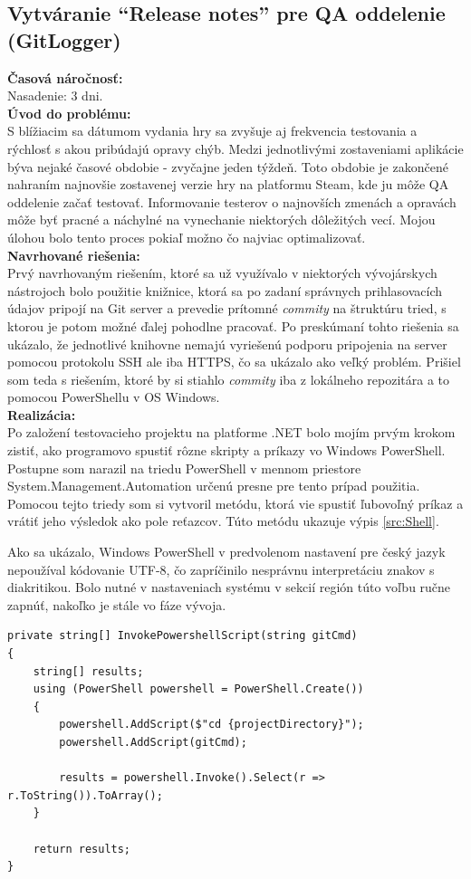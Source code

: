 \documentclass[slovak,bachelorpractice]{diploma}
\begin{document}
\subsection{Vytváranie \enquote{Release notes} pre QA oddelenie (GitLogger)}
\label{sec:GitLogger}
\textbf{Časová náročnosť:} \\ Nasadenie: 3 dni.\\
\textbf{Úvod do problému:} \\ S blížiacim sa dátumom vydania hry sa zvyšuje aj frekvencia testovania a rýchlosť s akou pribúdajú opravy chýb. Medzi jednotlivými zostaveniami aplikácie býva nejaké časové obdobie - zvyčajne jeden týždeň. Toto obdobie je zakončené nahraním najnovšie zostavenej verzie hry na platformu Steam, kde ju môže QA oddelenie začať testovať. Informovanie testerov o najnovších zmenách a opravách môže byť pracné a náchylné na vynechanie niektorých dôležitých vecí. Mojou úlohou bolo tento proces pokiaľ možno čo najviac optimalizovať.\\
\textbf{Navrhované riešenia:} \\ Prvý navrhovaným riešením, ktoré sa už využívalo v niektorých vývojárskych nástrojoch bolo použitie knižnice, ktorá sa po zadaní správnych prihlasovacích údajov pripojí na Git server a prevedie prítomné \textit{commity} na štruktúru tried, s ktorou je potom možné ďalej pohodlne pracovať. Po preskúmaní tohto riešenia sa ukázalo, že jednotlivé knihovne nemajú vyriešenú podporu pripojenia na server pomocou protokolu SSH ale iba HTTPS, čo sa ukázalo ako veľký problém. Prišiel som teda s riešením, ktoré by si stiahlo \textit{commity} iba z lokálneho repozitára a to pomocou PowerShellu v OS Windows.  \\
\textbf{Realizácia:} \\ Po založení testovacieho projektu na platforme .NET bolo mojím prvým krokom zistiť, ako programovo spustiť rôzne skripty a príkazy vo Windows PowerShell. Postupne som narazil na triedu PowerShell v mennom priestore System.Management.Automation určenú presne pre tento prípad použitia. Pomocou tejto triedy som si vytvoril metódu, ktorá vie spustiť ľubovoľný príkaz a vrátiť jeho výsledok ako pole reťazcov. Túto metódu ukazuje výpis \ref{src:Shell}. 

Ako sa ukázalo, Windows PowerShell v predvolenom nastavení pre český jazyk nepoužíval kódovanie UTF-8, čo zapríčinilo nesprávnu interpretáciu znakov s diakritikou. Bolo nutné v nastaveniach systému v sekcií región túto voľbu ručne zapnúť, nakoľko je stále vo fáze vývoja.
\vspace{10pt}
\begin{lstlisting}[label=src:Shell,caption={Metóda InvokePowershellScript triedy GitLogger}]
private string[] InvokePowershellScript(string gitCmd)
{
    string[] results;
    using (PowerShell powershell = PowerShell.Create())
    {
        powershell.AddScript($"cd {projectDirectory}");
        powershell.AddScript(gitCmd);

        results = powershell.Invoke().Select(r => r.ToString()).ToArray();
    }

    return results;
}
\end{lstlisting}
\end{document}
